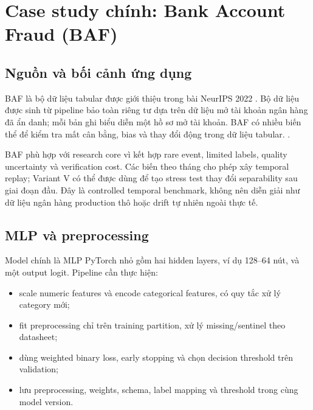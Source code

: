 \section{Case study chính: Bank Account Fraud (BAF)}

\subsection{Nguồn và bối cảnh ứng dụng}

BAF là bộ dữ liệu tabular được giới thiệu trong bài NeurIPS 2022 . Bộ dữ liệu được sinh từ pipeline bảo toàn riêng tư dựa trên dữ liệu mở tài khoản ngân hàng đã ẩn danh; mỗi bản ghi biểu diễn một hồ sơ mở tài khoản. BAF có nhiều biến thể để kiểm tra mất cân bằng, bias và thay đổi động trong dữ liệu tabular. .

BAF phù hợp với research core vì kết hợp rare event, limited labels, quality uncertainty và verification cost. Các biến theo tháng cho phép xây temporal replay; Variant V có thể được dùng để tạo stress test thay đổi separability sau giai đoạn đầu. Đây là controlled temporal benchmark, không nên diễn giải như dữ liệu ngân hàng production thô hoặc drift tự nhiên ngoài thực tế.

\subsection{MLP và preprocessing}

Model chính là MLP PyTorch nhỏ gồm hai hidden layers, ví dụ 128--64 nút, và một output logit. Pipeline cần thực hiện:

\begin{itemize}
  \item scale numeric features và encode categorical features, có quy tắc xử lý category mới;
  \item fit preprocessing chỉ trên training partition, xử lý missing/sentinel theo datasheet;
  \item dùng weighted binary loss, early stopping và chọn decision threshold trên validation;
  \item lưu preprocessing, weights, schema, label mapping và threshold trong cùng model version.
\end{itemize}

